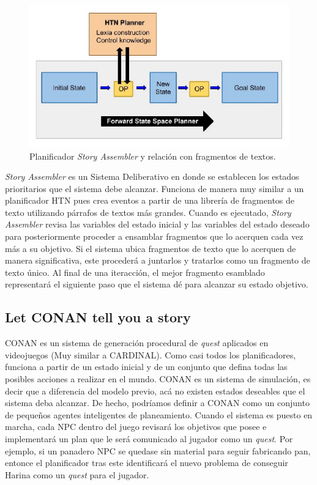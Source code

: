 \begin{figure}[tph!]
\centerline{\includegraphics[totalheight=7cm]{1}}
    \caption{Planificador \textit{Story Assembler} y relación con fragmentos de textos. \cite{garbe2019storyassembler}}
    \label{fig:ptest1}
\end{figure}


\textit{Story Assembler} es un Sistema Deliberativo en donde se establecen los estados prioritarios que el sistema debe alcanzar. Funciona de manera  muy similar a un planificador \ac{HTN} pues crea eventos a partir de una librería de fragmentos de texto utilizando párrafos de textos más grandes. Cuando es ejecutado, \textit{Story Assembler} revisa las variables del estado inicial y las variables del estado deseado para posteriormente proceder a ensamblar fragmentos que lo acerquen cada vez más a su objetivo. Si el sistema ubica fragmentos de texto que lo acerquen de manera significativa, este procederá a juntarlos y tratarlos como un fragmento de texto único. Al final de una iteracción, el mejor fragmento esamblado representará el siguiente paso que el sistema dé para alcanzar su estado objetivo. 

\subsection{Let CONAN tell you a story} 

CONAN \cite{breault2018let} es un sistema de generación procedural de \textit{quest} aplicados en videojuegos (Muy similar a CARDINAL). Como casi todos los planificadores, funciona a partir de un estado inicial y de un conjunto que defina todas las posibles acciones a realizar en el mundo. CONAN es un sistema de simulación, es decir que a diferencia del modelo previo, acá no existen estados deseables que el sistema deba alcanzar. De hecho, podríamos definir a CONAN como un conjunto de pequeños agentes inteligentes de planeamiento. Cuando el sistema es puesto en marcha, cada \ac{NPC} dentro del juego revisará los objetivos que posee e implementará un plan que le será comunicado al jugador como un \textit{quest}. Por ejemplo, si un panadero \ac{NPC} se quedase sin material para seguir fabricando pan, entonce el planificador tras este identificará el nuevo problema de  conseguir Harina como un \textit{quest} para el jugador.

